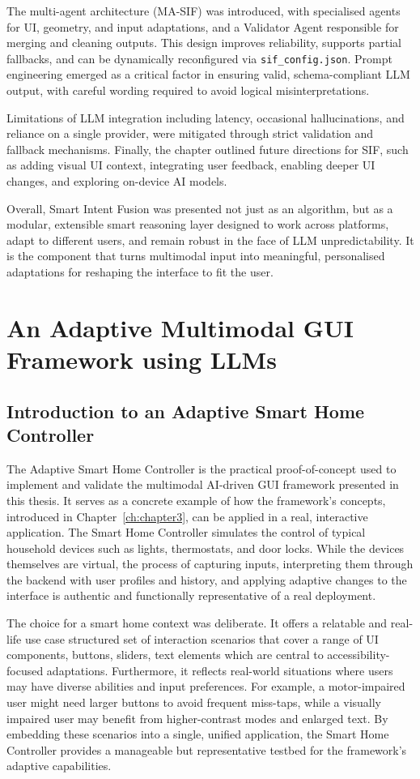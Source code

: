 \documentclass[openany]{book}
\begin{document}
The multi-agent architecture (MA-SIF) was introduced, with specialised agents for UI, geometry, and input adaptations, and a Validator Agent responsible for merging and cleaning outputs. This design improves reliability, supports partial fallbacks, and can be dynamically reconfigured via \texttt{sif\_config.json}. Prompt engineering emerged as a critical factor in ensuring valid, schema-compliant LLM output, with careful wording required to avoid logical misinterpretations.

Limitations of LLM integration including latency, occasional hallucinations, and reliance on a single provider, were mitigated through strict validation and fallback mechanisms. Finally, the chapter outlined future directions for SIF, such as adding visual UI context, integrating user feedback, enabling deeper UI changes, and exploring on-device AI models.

Overall, Smart Intent Fusion was presented not just as an algorithm, but as a modular, extensible smart reasoning layer designed to work across platforms, adapt to different users, and remain robust in the face of LLM unpredictability. It is the component that turns multimodal input into meaningful, personalised adaptations for reshaping the interface to fit the user.

\chapter{An Adaptive Multimodal GUI Framework using LLMs}
\label{ch:chapter5}

\section{Introduction to an Adaptive Smart Home Controller}
The Adaptive Smart Home Controller is the practical proof-of-concept used to implement and validate the multimodal AI-driven GUI framework presented in this thesis. It serves as a concrete example of how the framework’s concepts, introduced in Chapter~\ref{ch:chapter3}, can be applied in a real, interactive application. The Smart Home Controller simulates the control of typical household devices such as lights, thermostats, and door locks. While the devices themselves are virtual, the process of capturing inputs, interpreting them through the backend with user profiles and history, and applying adaptive changes to the interface is authentic and functionally representative of a real deployment.

The choice for a smart home context was deliberate. It offers a relatable and real-life use case structured set of interaction scenarios that cover a range of UI components, buttons, sliders, text elements which are central to accessibility-focused adaptations. Furthermore, it reflects real-world situations where users may have diverse abilities and input preferences. For example, a motor-impaired user might need larger buttons to avoid frequent miss-taps, while a visually impaired user may benefit from higher-contrast modes and enlarged text. By embedding these scenarios into a single, unified application, the Smart Home Controller provides a manageable but representative testbed for the framework’s adaptive capabilities.
\end{document}
